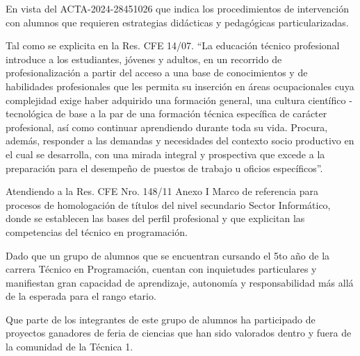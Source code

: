 En vista del ACTA-2024-28451026 que indica los procedimientos de intervención con  alumnos que requieren estrategias didácticas y pedagógicas particularizadas.

Tal como se explicita en la Res. CFE 14/07. “La educación técnico profesional introduce a los estudiantes, jóvenes y adultos, en un recorrido de profesionalización a partir del acceso a una base de conocimientos y de habilidades profesionales que les permita su inserción en áreas ocupacionales cuya complejidad exige haber adquirido una formación general, una cultura científico - tecnológica de base a la par de una formación técnica específica de carácter profesional, así como continuar aprendiendo durante toda su vida. Procura, además, responder a las demandas y necesidades del contexto socio productivo en el cual se desarrolla, con una mirada integral y prospectiva que excede a la preparación para el desempeño de puestos de trabajo u oficios específicos”.

Atendiendo a la Res. CFE Nro. 148/11 Anexo I Marco de referencia para procesos de homologación de títulos del nivel secundario Sector Informático, donde se establecen las bases del perfil profesional y que explicitan las competencias del técnico en programación.

Dado que un grupo de alumnos que se encuentran cursando el 5to año de la carrera Técnico en Programación, cuentan con inquietudes particulares y manifiestan gran capacidad de aprendizaje, autonomía y responsabilidad más allá de la esperada para el rango etario.

Que parte de los integrantes de este grupo de alumnos ha participado de proyectos ganadores de feria de ciencias que han sido valorados dentro y fuera de la comunidad de la Técnica 1.
